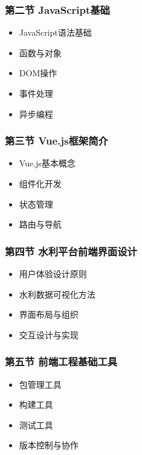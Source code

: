\subsubsection{第二节
JavaScript基础}\label{ux7b2cux4e8cux8282-javascriptux57faux7840}

\begin{itemize}
\tightlist
\item
  JavaScript语法基础
\item
  函数与对象
\item
  DOM操作
\item
  事件处理
\item
  异步编程
\end{itemize}

\subsubsection{第三节
Vue.js框架简介}\label{ux7b2cux4e09ux8282-vue.jsux6846ux67b6ux7b80ux4ecb}

\begin{itemize}
\tightlist
\item
  Vue.js基本概念
\item
  组件化开发
\item
  状态管理
\item
  路由与导航
\end{itemize}

\subsubsection{第四节
水利平台前端界面设计}\label{ux7b2cux56dbux8282-ux6c34ux5229ux5e73ux53f0ux524dux7aefux754cux9762ux8bbeux8ba1}

\begin{itemize}
\tightlist
\item
  用户体验设计原则
\item
  水利数据可视化方法
\item
  界面布局与组织
\item
  交互设计与实现
\end{itemize}

\subsubsection{第五节
前端工程基础工具}\label{ux7b2cux4e94ux8282-ux524dux7aefux5de5ux7a0bux57faux7840ux5de5ux5177}

\begin{itemize}
\tightlist
\item
  包管理工具
\item
  构建工具
\item
  测试工具
\item
  版本控制与协作
\end{itemize}
